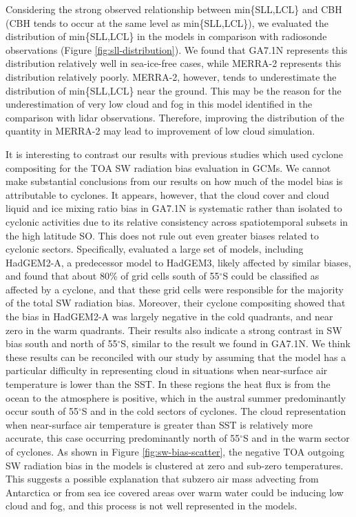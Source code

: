 Considering the strong observed relationship between min\{SLL,LCL\} and CBH
(CBH tends to occur at the same level as min\{SLL,LCL\}), we evaluated the
distribution of min\{SLL,LCL\} in the models in comparison with radiosonde
observations (Figure \ref{fig:sll-distribution}).  We found that GA7.1N
represents this distribution relatively well in sea-ice-free cases, while
MERRA-2 represents this distribution relatively poorly. MERRA-2, however, tends
to underestimate the distribution of min\{SLL,LCL\} near the ground. This may
be the reason for the underestimation of very low cloud and fog in this model
identified in the comparison with lidar observations. Therefore, improving the
distribution of the quantity in MERRA-2 may lead to improvement of low cloud
simulation.

It is interesting to contrast our results with previous studies which used
cyclone compositing for the TOA SW radiation bias evaluation in GCMs. We cannot
make substantial conclusions from our results on how much of the model bias is
attributable to cyclones. It appears, however, that the cloud cover and cloud
liquid and ice mixing ratio bias in GA7.1N is systematic rather than isolated to
cyclonic activities due to its relative consistency across spatiotemporal
subsets in the high latitude SO. This does not rule out even greater biases
related to cyclonic sectors. Specifically, \cite{bodas-salcedo2014} evaluated a
large set of models, including HadGEM2-A, a predecessor model to HadGEM3,
likely affected by similar biases, and found that about 80\% of grid cells
south of 55$^\circ$S could be classified as affected by a cyclone, and that
these grid cells were responsible for the majority of the total SW radiation
bias.  Moreover, their cyclone compositing showed that the bias in HadGEM2-A
was largely negative in the cold quadrants, and near zero in the warm
quadrants.  Their results also indicate a strong contrast in SW bias south and
north of 55$^\circ$S, similar to the result we found in GA7.1N.  We think these
results can be reconciled with our study by assuming that the model has a
particular difficulty in representing cloud in situations when near-surface air
temperature is lower than the SST. In these regions the heat flux is from the
ocean to the atmosphere is positive, which in the austral summer predominantly
occur south of 55$^\circ$S and in the cold sectors of cyclones. The cloud
representation when near-surface air temperature is greater than SST is
relatively more accurate, this case occurring predominantly north of
55$^\circ$S and in the warm sector of cyclones.  As shown in Figure
\ref{fig:sw-bias-scatter}, the negative TOA outgoing SW radiation bias in the
models is clustered at zero and sub-zero temperatures.  This suggests a
possible explanation that subzero air mass advecting from Antarctica or from
sea ice covered areas over warm water could be inducing low cloud and fog, and
this process is not well represented in the models.

